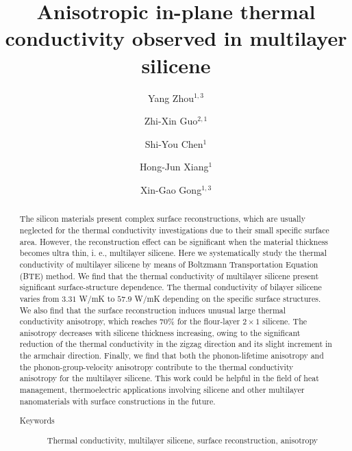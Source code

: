 \documentclass[aps,prb,twocolumn,showpacs,amsmath,amssymb]{revtex4-1}
\begin{document}
\title{Anisotropic in-plane thermal conductivity observed in multilayer silicene}
\author{Yang Zhou${}^{1,3}$}
\author{Zhi-Xin Guo${}^{2,1}$}
\author{Shi-You Chen${}^{1}$}
\author{Hong-Jun Xiang${}^{1}$}
\author{Xin-Gao Gong${}^{1,3}$}
\begin{abstract}
The silicon materials present complex surface reconstructions, which are usually neglected for the thermal conductivity investigations due to their small specific surface area. However, the reconstruction effect can be significant when the material thickness becomes ultra thin, i. e., multilayer silicene. Here we systematically study the thermal conductivity of multilayer silicene by means of Boltzmann Transportation Equation (BTE) method.  We find that the thermal conductivity of multilayer silicene present significant surface-structure dependence. The thermal conductivity of bilayer silicene varies from $3.31$ W/mK to $57.9$ W/mK depending on the specific surface structures. We also find that the surface reconstruction induces unusual large thermal conductivity anisotropy, which reaches 70\%  for the flour-layer  $2\times1$ silicene.  The anisotropy decreases with silicene thickness increasing, owing to the significant reduction of the thermal conductivity in the zigzag direction and its slight increment  in the armchair direction. 
Finally, we find that both the phonon-lifetime  anisotropy and the phonon-group-velocity  anisotropy contribute to the thermal conductivity anisotropy for the multilayer silicene.
This work could be helpful in the field of heat management, thermoelectric applications involving silicene and other multilayer nanomaterials  with surface constructions in the future.

  \begin{description}
    \item[Keywords]
          Thermal conductivity, multilayer silicene, surface reconstruction, anisotropy
  \end{description}
\end{abstract}
\end{document}
